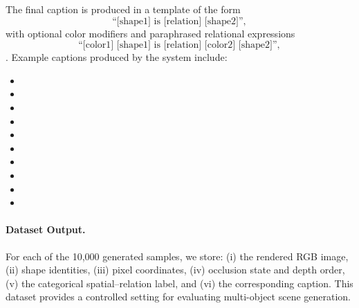 The final caption is produced in a template of the form
\[
\text{``[shape1] is [relation] [shape2]''},
\]
with optional color modifiers and paraphrased relational expressions
\[
\text{``[color1] [shape1] is [relation] [color2] [shape2]''},
\]
. 
Example captions produced by the system include:
\begin{itemize}
    \item {}
    \item {}
    \item {}
    \item {}
    \item {}
    \item {}
    \item {}
    \item {}
    \item {}
    \item {}
\end{itemize}

\paragraph{Dataset Output.}
For each of the 10{,}000 generated samples, we store:
(i) the rendered RGB image,
(ii) shape identities,
(iii) pixel coordinates,
(iv) occlusion state and depth order,
(v) the categorical spatial–relation label,
and (vi) the corresponding caption.  
This dataset provides a controlled setting for evaluating multi-object scene generation. 


